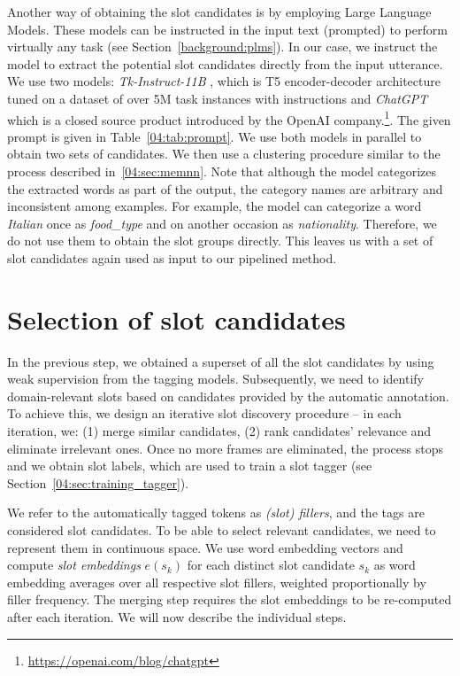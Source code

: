 Another way of obtaining the slot candidates is by employing Large Language Models.
These models can be instructed in the input text (prompted) to perform virtually any task (see Section~\ref{background:plms}).
In our case, we instruct the model to extract the potential slot candidates directly from the input utterance.
We use two models: \emph{Tk-Instruct-11B} \cite{supernaturalinstructions}, which is T5 encoder-decoder architecture \cite{2020t5} tuned on a dataset of over 5M task instances with instructions and \emph{ChatGPT} which is a closed source product introduced by the OpenAI company.\footnote{\url{https://openai.com/blog/chatgpt}}.
The given prompt is given in Table~\ref{04:tab:prompt}.
We use both models in parallel to obtain two sets of candidates.
We then use a clustering procedure similar to the process described in~\ref{04:sec:memnn}.
Note that although the model categorizes the extracted words as part of the output, the category names are arbitrary and inconsistent among examples.
For example, the model can categorize a word \emph{Italian} once as \textit{food\_type} and on another occasion as \emph{nationality}.
Therefore, we do not use them to obtain the slot groups directly.
This leaves us with a set of slot candidates again used as input to our pipelined method.

\section{Selection of slot candidates}
\label{04:sec:candidate_selection}
In the previous step, we obtained a superset of all the slot candidates by using weak supervision from the tagging models.
Subsequently, we need to identify domain-relevant slots based on candidates provided by the automatic annotation.
To achieve this, we design an iterative slot discovery procedure -- in each iteration, we: 
(1) merge similar candidates, 
(2) rank candidates' relevance and eliminate irrelevant ones.
Once no more frames are eliminated, the process stops and we obtain slot labels, which are used to train a slot tagger (see Section~\ref{04:sec:training_tagger}).

We refer to the automatically tagged tokens as \emph{(slot) fillers}, and the tags are considered slot candidates.
To be able to select relevant candidates, we need to represent them in continuous space.
We use word embedding vectors and compute \emph{slot embeddings} $e(s_k)$ for each 
distinct slot candidate $s_k$ as word embedding averages over all respective slot fillers, weighted proportionally by filler frequency.
The merging step requires the slot embeddings to be re-computed after each iteration.
We will now describe the individual steps.

